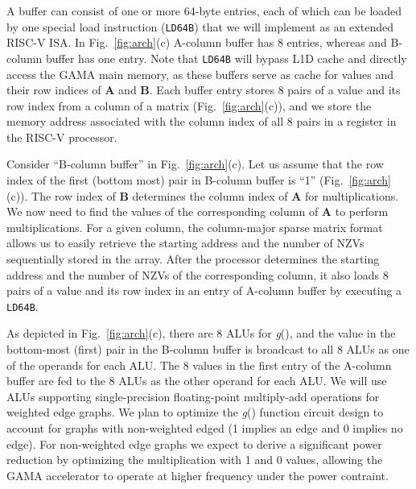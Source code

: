 A buffer can consist of one or more 64-byte entries, each of which can be loaded by one special load instruction (\texttt{LD64B}) that we will implement as an extended RISC-V ISA. 
In Fig.~\ref{fig:arch}(c) A-column buffer has 8 entries, whereas and B-column buffer has one entry.
Note that \texttt{LD64B} will bypass L1D cache and directly access the GAMA main memory, as these buffers serve as cache for values and their row indices of \textbf{A} and \textbf{B}.
Each buffer entry stores 8 pairs of a value and its row index from a column of a matrix (Fig.~\ref{fig:arch}(c)), and
we store the memory address associated with the column index of all 8 pairs in a register in the RISC-V processor.


Consider ``B-column buffer'' in Fig.~\ref{fig:arch}(c). 
Let us assume that the row index of the first (bottom most) pair in B-column buffer is ``1'' (Fig.~\ref{fig:arch}(c)).
The row index of \textbf{B} determines the column index of \textbf{A} for multiplications. %
We now need to find the values of the corresponding column of \textbf{A} to perform multiplications.  
For a given column, the column-major sparse matrix format allows us to easily retrieve the starting address and the number of NZVs sequentially stored in the array. 
After the processor determines the starting address and the number of NZVs of the corresponding column, 
it also loads 8 pairs of a value and its row index in an entry of A-column buffer by executing a \texttt{LD64B}.


As depicted in Fig.~\ref{fig:arch}(c), there are 8 ALUs for \textit{g}(), and the value in the bottom-most (first) pair in the B-column buffer 
is broadcast to all 8 ALUs as one of the operands for each ALU.
The 8 values in the first entry of the A-column buffer are fed to the 8 ALUs as the other operand for each ALU.
We will use ALUs supporting single-precision floating-point multiply-add operations for weighted edge graphs. 
We plan to optimize the \textit{g}() function circuit design to account for graphs with non-weighted edged (1 implies an edge and 0 implies no edge). 
For non-weighted edge graphs we expect to derive a significant power reduction by optimizing the multiplication with 1 and 0 values, 
allowing the GAMA accelerator to operate at higher frequency under the power contraint.     
 
